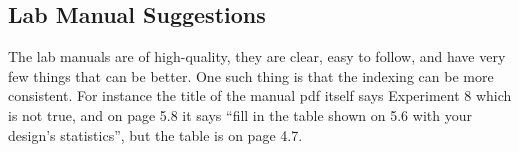 \documentclass{article}
\begin{document}
\subsection{Lab Manual Suggestions}
The lab manuals are of high-quality, they are clear, easy to follow, and have very few things that can be better. One such thing is that the indexing can be more consistent. For instance the title of the manual pdf itself says Experiment 8 which is not true, and on page 5.8 it says ``fill in the table shown on 5.6 with your design's statistics'', but the table is on page 4.7.
\end{document}
